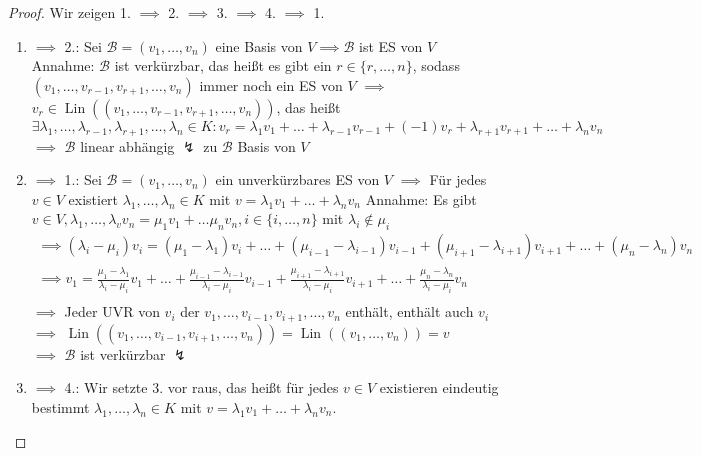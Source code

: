 \documentclass[a4paper]{scrartcl}
\DeclareMathOperator{\Exists}{\exists}
\DeclareMathOperator{\Lin}{Lin}
\theoremstyle{definition}
\theoremstyle{plain}
\theoremstyle{plain}
\theoremstyle{remark}
\theoremstyle{remark}
\theoremstyle{remark}
\theoremstyle{remark}
\theoremstyle{remark}
\begin{document}
\begin{proof}
Wir zeigen 1. $\implies$ 2. $\implies$ 3. $\implies$ 4. $\implies$ 1. \\
\begin{enumerate}
\item $\implies$ 2.: Sei $\mathcal{B} = (v_1, \ldots, v_n)$ eine Basis von $V \implies \mathcal{B}$ ist ES von $V$ \\
     Annahme: $\mathcal{B}$ ist verkürzbar, das heißt es gibt ein $r\in\{r, \ldots, n\}$, sodass $(v_1, \ldots, v_{r - 1}, v_{r + 1}, \ldots, v_n)$ immer noch ein ES von $V$
$\implies$ $v_r \in \Lin((v_1, \ldots, v_{r - 1}, v_{r + 1}, \ldots, v_n))$, das heißt
\[\Exists \lambda_1, \ldots, \lambda_{r - 1}, \lambda_{r + 1}, \ldots, \lambda_n\in K: v_r = \lambda_1 v_1 + \ldots + \lambda_{r - 1} v_{r - 1} + (-1)v_r + \lambda_{r + 1} v_{r + 1} + \ldots + \lambda_n v_n\]
$\implies$ $\mathcal{B}$ linear abhängig $\lightning$ zu $\mathcal{B}$ Basis von $V$
\item $\implies$ 1.: Sei $\mathcal{B} = (v_1, \ldots, v_n)$ ein unverkürzbares ES von $V$ $\implies$ Für jedes $v\in V$ existiert $\lambda_1, \ldots, \lambda_n \in K$ mit $v = \lambda_1 v_1 + \ldots + \lambda_n v_n$
     Annahme: Es gibt $v\in V, \lambda_1, \ldots, \lambda_v v_n = \mu_1 v_1 + \ldots \mu_n v_n, i \in \{i, \ldots, n\}$ mit $\lambda_i \not \in \mu_i$
\begin{align*}
\implies (\lambda_i - \mu_i) v_i = (\mu_1 - \lambda_1)v_i + \ldots + (\mu_{i - 1} - \lambda_{i - 1})v_{i - 1} + (\mu_{i + 1} - \lambda_{i + 1}) v_{i + 1} + \ldots + (\mu_n - \lambda_n) v_n \\
\implies v_1 = \frac{\mu_{1} - \lambda_{1}}{\lambda_{i} - \mu_{i}} v_1 + \ldots + \frac{\mu_{i - 1} - \lambda_{i - 1}}{\lambda_{i} - \mu_{i}} v_{i - 1} + \frac{\mu_{i + 1} - \lambda_{i + 1}}{\lambda_{i} - \mu_{i}} v_{i + 1} + \ldots + \frac{\mu_{n} - \lambda_{n}}{\lambda_{i} - \mu_{i}} v_n \\
\end{align*}
$\implies$ Jeder UVR von $v_i$ der $v_1, \ldots, v_{i - 1}, v_{i + 1}, \ldots, v_n$  enthält, enthält auch $v_i$ \\
     $\implies$ $\Lin((v_1, \ldots, v_{i - 1}, v_{i + 1}, \ldots, v_n)) = \Lin((v_1, \ldots, v_n)) = v$ \\
     $\implies$ $\mathcal{B}$ ist verkürzbar $\lightning$
\item $\implies$ 4.: Wir setzte 3. vor raus, das heißt für jedes $v\in V$ existieren eindeutig bestimmt $\lambda_1, \ldots, \lambda_n \in K$ mit $v = \lambda_1 v_1 + \ldots + \lambda_n v_n$. \\

\end{enumerate}
\end{proof}
\end{document}
